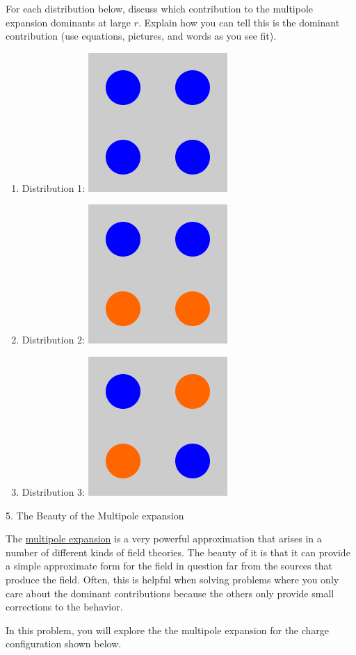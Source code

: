 \documentclass[11pt]{article}
\def\tightlist{}
\begin{document}
For each distribution below, discuss which contribution to the multipole
expansion dominants at large \(r\). Explain how you can tell this is the
dominant contribution (use equations, pictures, and words as you see
fit).

\begin{enumerate}
\def\labelenumi{\arabic{enumi}.}
\tightlist
\item
  Distribution 1: \includegraphics[width=0.2\linewidth]{./images/hw6/distribution1.png}
\item
  Distribution 2: \includegraphics[width=0.2\linewidth]{./images/hw6/distribution2.png}
\item
  Distribution 3: \includegraphics[width=0.2\linewidth]{./images/hw6/distribution3.png}
\end{enumerate}

{\Large 5. The Beauty of the Multipole
expansion}\label{the-beauty-of-the-multipole-expansion}

The \href{https://en.wikipedia.org/wiki/Multipole_expansion}{multipole
expansion} is a very powerful approximation that arises in a number of
different kinds of field theories. The beauty of it is that it can
provide a simple approximate form for the field in question far from the
sources that produce the field. Often, this is helpful when solving
problems where you only care about the dominant contributions because
the others only provide small corrections to the behavior.

In this problem, you will explore the the multipole expansion for the
charge configuration shown below.
\end{document}
